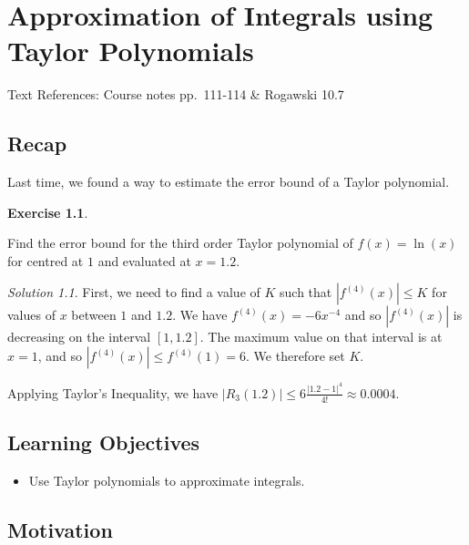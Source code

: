 \documentclass[
]{book}
\providecommand{\tightlist}{%
  \setlength{\itemsep}{0pt}\setlength{\parskip}{0pt}}
\theoremstyle{definition}
\theoremstyle{definition}
\theoremstyle{definition}
\newtheorem{exercise}{Exercise}[chapter]
\theoremstyle{definition}
\theoremstyle{remark}
\newtheorem*{solution}{Solution}
\begin{document}
\hypertarget{lec-24}{%
\chapter{Approximation of Integrals using Taylor Polynomials}\label{lec-24}}

Text References: Course notes pp.~111-114 \& Rogawski 10.7

\hypertarget{recap-22}{%
\section{Recap}\label{recap-22}}

Last time, we found a way to estimate the error bound of a Taylor polynomial.

\begin{exercise}
\protect\hypertarget{exr:unlabeled-div-166}{}\label{exr:unlabeled-div-166}

Find the error bound for the third order Taylor polynomial of \(f(x)=\ln(x)\) for centred at \(1\) and evaluated at \(x=1.2\).

\end{exercise}

\begin{solution}

First, we need to find a value of \(K\) such that \(|f^{(4)}(x)|\leq K\) for values of \(x\) between \(1\) and \(1.2\). We have \(f^{(4)}(x)=-6x^{-4}\) and so \(|f^{(4)}(x)|\) is decreasing on the interval \([1, 1.2]\). The maximum value on that interval is at \(x=1\), and so \(|f^{(4)}(x)|\leq f^{(4)}(1)=6\). We therefore set \(K\).

Applying Taylor's Inequality, we have \(\displaystyle |R_3(1.2)|\leq 6 \frac{|1.2-1|^4}{4!}\approx 0.0004\).

\end{solution}

\hypertarget{learning-objectives-23}{%
\section{Learning Objectives}\label{learning-objectives-23}}

\begin{itemize}
\tightlist
\item
  Use Taylor polynomials to approximate integrals.
\end{itemize}

\hypertarget{motivation-1}{%
\section{Motivation}\label{motivation-1}}
\end{document}
